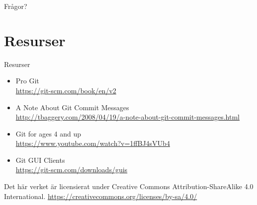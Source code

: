 \documentclass[11pt,xetex]{beamer}
\begin{document}
\begin{frame}[standout]
  \Huge
  Frågor?
\end{frame}


\section*{Resurser}

\begin{frame}{Resurser}
  \begin{itemize}
    \item Pro Git \\
      \url{https://git-scm.com/book/en/v2}
    \item A Note About Git Commit Messages \\
      \url{http://tbaggery.com/2008/04/19/a-note-about-git-commit-messages.html}
    \item Git for ages 4 and up \\
      \url{https://www.youtube.com/watch?v=1ffBJ4sVUb4}
    \item Git GUI Clients \\
      \url{https://git-scm.com/downloads/guis}
  \end{itemize}
\end{frame}


\begin{frame}[standout]{}
  \begin{center}
    Det här verket är licensierat under Creative Commons
    Attribution-ShareAlike 4.0 International.
    \url{https://creativecommons.org/licenses/by-sa/4.0/}
  \end{center}
\end{frame}
\end{document}
